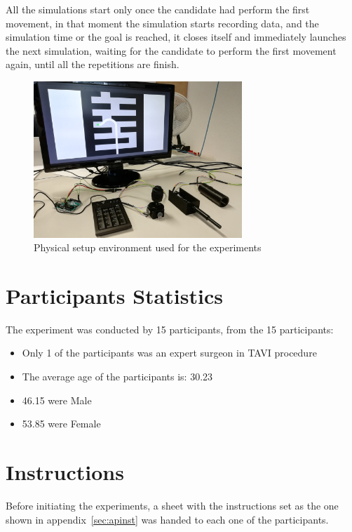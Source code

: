All the simulations start only once the candidate had perform the first movement, in that moment the simulation starts recording data, and the simulation time or the goal is reached, it closes itself and immediately launches the next simulation, waiting for the candidate to perform the first movement again, until all the repetitions are finish.\\

\begin{figure}[ht]
   \centering
   \includegraphics[width=0.7\textwidth]{img/setup.jpg}
   \caption{Physical setup environment used for the experiments}
   \label{img:setupphy}
\end{figure}

\section{Participants Statistics}\label{sec:partstats}
The experiment was conducted by 15 participants, from the 15 participants:
\begin{itemize}
\item  Only 1 of the participants was an expert surgeon in TAVI procedure
 \item The average age of the participants is: 30.23
 \item 46.15 were Male
 \item 	53.85 were Female
\end{itemize}


\section{Instructions}\label{sec:instructions}
Before initiating the experiments, a sheet with the instructions set as the one shown in appendix~\ref{sec:apinst} was handed to each one of the participants.\\


